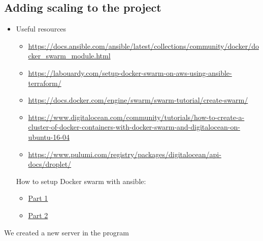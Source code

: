 \subsection{Adding scaling to the project}
\label{log:adding-scaling-to-the-project}

\begin{itemize}
    \item Useful resources
    \begin{itemize}
        \item \url{https://docs.ansible.com/ansible/latest/collections/community/docker/docker_swarm_module.html}
        \item \url{https://labouardy.com/setup-docker-swarm-on-aws-using-ansible-terraform/}
        \item \url{https://docs.docker.com/engine/swarm/swarm-tutorial/create-swarm/}
        \item \url{https://www.digitalocean.com/community/tutorials/how-to-create-a-cluster-of-docker-containers-with-docker-swarm-and-digitalocean-on-ubuntu-16-04}
        \item \url{https://www.pulumi.com/registry/packages/digitalocean/api-docs/droplet/}
    \end{itemize}

    How to setup Docker swarm with ansible:

    \begin{itemize}
        \item \href{https://www.youtube.com/watch?v=xZx9XoBnAUI}{Part 1}
        \item \href{https://www.youtube.com/watch?v=qVGO5_bKmpE\&list=PLWZKNB9waqIXEL-NIapWwIADPtkspe9vk\&index=47\&t=201s}{Part 2}
    \end{itemize}
\end{itemize}

We created a new server in the program



